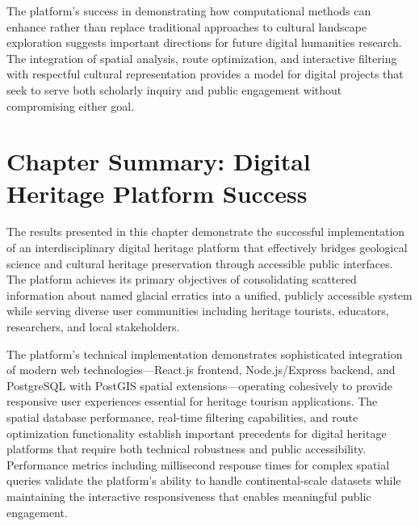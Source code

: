 
The platform's success in demonstrating how computational methods can enhance rather than replace traditional approaches to cultural landscape exploration suggests important directions for future digital humanities research. The integration of spatial analysis, route optimization, and interactive filtering with respectful cultural representation provides a model for digital projects that seek to serve both scholarly inquiry and public engagement without compromising either goal.

\section{Chapter Summary: Digital Heritage Platform Success}
\label{sec:results_summary}

The results presented in this chapter demonstrate the successful implementation of an interdisciplinary digital heritage platform that effectively bridges geological science and cultural heritage preservation through accessible public interfaces. The platform achieves its primary objectives of consolidating scattered information about named glacial erratics into a unified, publicly accessible system while serving diverse user communities including heritage tourists, educators, researchers, and local stakeholders.

The platform's technical implementation demonstrates sophisticated integration of modern web technologies—React.js frontend, Node.js/Express backend, and PostgreSQL with PostGIS spatial extensions—operating cohesively to provide responsive user experiences essential for heritage tourism applications. The spatial database performance, real-time filtering capabilities, and route optimization functionality establish important precedents for digital heritage platforms that require both technical robustness and public accessibility. Performance metrics including millisecond response times for complex spatial queries validate the platform's ability to handle continental-scale datasets while maintaining the interactive responsiveness that enables meaningful public engagement.

